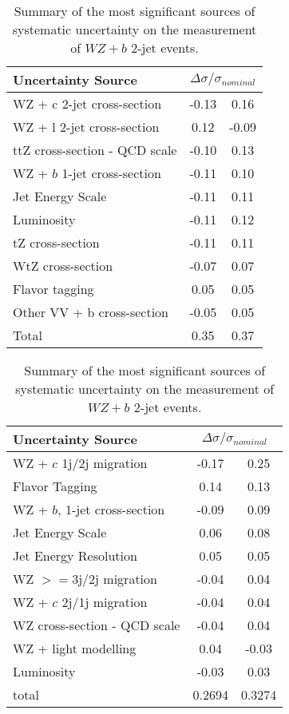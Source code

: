\begin{table}[H]
    \centering
    \begin{tabular}{l|cc}
        \hline\hline
        Uncertainty Source & \multicolumn{2}{c}{$\Delta \sigma/\sigma_{nominal}$ }  \\
        \hline
        WZ + c 2-jet cross-section & -0.13 & 0.16 \\
        WZ + l 2-jet cross-section & 0.12 & -0.09 \\
        ttZ cross-section - QCD scale & -0.10 & 0.13 \\
        WZ + $b$ 1-jet cross-section & -0.11 & 0.10 \\
        Jet Energy Scale & -0.11 & 0.11 \\
        Luminosity & -0.11 & 0.12 \\
        tZ cross-section & -0.11 & 0.11 \\
        WtZ cross-section & -0.07 & 0.07 \\
        Flavor tagging  & 0.05 & 0.05 \\
        Other VV + b cross-section & -0.05 & 0.05 \\
        \hline
        Total & 0.35 & 0.37 \\
        \hline\hline
    \end{tabular}%
    \begin{tabular}{l|cc}
        \hline\hline
        Uncertainty Source & \multicolumn{2}{c}{$\Delta \sigma/\sigma_{nominal}$ }  \\
        \hline
        WZ + $c$ 1j/2j migration & -0.17 & 0.25 \\
        Flavor Tagging & 0.14 & 0.13 \\
        WZ + $b$, 1-jet cross-section & -0.09 & 0.09 \\
        Jet Energy Scale & 0.06 & 0.08 \\
        Jet Energy Resolution & 0.05 & 0.05 \\
        WZ $>=$3j/2j migration & -0.04 & 0.04 \\
        WZ + $c$ 2j/1j migration & -0.04 & 0.04 \\
        WZ cross-section - QCD scale & -0.04 & 0.04 \\
        WZ + light modelling & 0.04 & -0.03 \\
        Luminosity & -0.03 & 0.03 \\
        \hline
        total & 0.2694 & 0.3274 \\
        \hline\hline
    \end{tabular}
    \caption{Summary of the most significant sources of systematic uncertainty on the measurement of $WZ+b$ 2-jet events.}
    \label{tab:systematics_2j}
\end{table}

